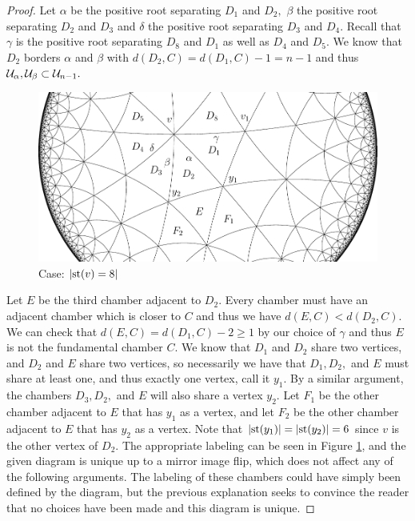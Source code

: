 \documentclass[class=book, crop=false]{standalone}
\begin{document}
\begin{proof}
	Let $\alpha$ be the positive root separating $D_1$ and $D_2,$ $\beta$ the positive root separating $D_2$ and $D_3$ and $\delta$ the positive root separating $D_3$ and $D_4.$ Recall that $\gamma$ is the positive root separating $D_8$ and $D_1$ as well as $D_4$ and $D_5.$ We know that $D_2$ borders $\alpha$ and $\beta$ with $d(D_2,C)=d(D_1,C)-1=n-1$ and thus $\mathcal{U}_\alpha,\mathcal{U}_\beta\subset \mathcal{U}_{n-1}.$ 
	\begin{figure}[h]
		\label{deg8433f2}
	\begin{center}
		\includegraphics{diagrams/deg8433f2.pdf}
	\end{center}
	\caption{Case: $|\mathrm{st}(v)=8|$}
\end{figure}

Let $E$ be the third chamber adjacent to $D_2.$ Every chamber must have an adjacent chamber which is closer to $C$ and thus we have $d(E,C)<d(D_2,C).$ We can check that $d(E,C)=d(D_1,C)-2\ge 1$ by our choice of $\gamma$ and thus $E$ is not the fundamental chamber $C.$ We know that $D_1$ and $D_2$ share two vertices, and $D_2$ and $E$ share two vertices, so necessarily we have that $D_1,D_2,$ and $E$ must share at least one, and thus exactly one vertex, call it $y_1.$ By a similar argument, the chambers $D_3,D_2,$ and $E$ will also share a vertex $y_2.$ Let $F_1$ be the other chamber adjacent to $E$ that has $y_1$ as a vertex, and let $F_2$ be the other chamber adjacent to $E$ that has $y_2$ as a vertex. Note that $|\mathrm{st}(y_1)|=|\mathrm{st}(y_2)|=6$ since $v$ is the other vertex of $D_2.$ The appropriate labeling can be seen in Figure \ref{deg8433f2}, and the given diagram is unique up to a mirror image flip, which does not affect any of the following arguments. The labeling of these chambers could have simply been defined by the diagram, but the previous explanation seeks to convince the reader that no choices have been made and this diagram is unique.


\end{proof}
\end{document}
